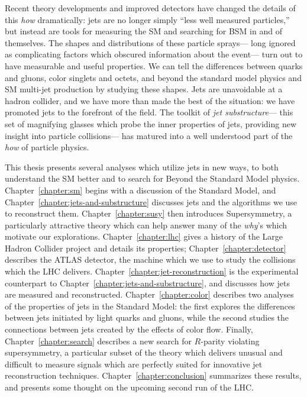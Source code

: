 Recent theory developments and improved detectors have changed the details of this \textit{how} dramatically: jets are no longer simply ``less well measured particles,'' but instead are tools for measuring the SM and searching for BSM in and of themselves. The shapes and distributions of these particle sprays--- long ignored as complicating factors which obscured information about the event--- turn out to have measurable and useful properties. We can tell the differences between quarks and gluons, color singlets and octets, and beyond the standard model physics and SM multi-jet production by studying these shapes. Jets are unavoidable at a hadron collider, and we have more than made the best of the situation: we have promoted jets to the forefront of the field. The toolkit of \textit{jet substructure}--- this set of magnifying glasses which probe the inner properties of jets, providing new insight into particle collisions--- has matured into a well understood part of the \textit{how} of particle physics.



This thesis presents several analyses which utilize jets in new ways, to both understand the SM better and to search for Beyond the Standard Model physics.  Chapter~\ref{chapter:sm} begins with a discussion of the Standard Model, and Chapter~\ref{chapter:jets-and-substructure} discusses jets and the algorithms we use to reconstruct them. Chapter~\ref{chapter:susy} then introduces Supersymmetry, a particularly attractive theory which can help answer many of the \textit{why}'s which motivate our explorations. Chapter~\ref{chapter:lhc} gives a history of the Large Hadron Collider project and details its properties; Chapter~\ref{chapter:detector} describes the ATLAS detector, the machine which we use to study the collisions which the LHC delivers. Chapter~\ref{chapter:jet-reconstruction} is the experimental counterpart to Chapter~\ref{chapter:jets-and-substructure}, and discusses how jets are measured and reconstructed. Chapter~\ref{chapter:color} describes two analyses of the properties of jets in the Standard Model: the first explores the differences between jets initiated by light quarks and gluons, while the second studies the connections between jets created by the effects of color flow. Finally, Chapter~\ref{chapter:search} describes a new search for $R$-parity violating supersymmetry, a particular subset of the theory which delivers unusual and difficult to measure signals which are perfectly suited for innovative jet reconstruction techniques. Chapter~\ref{chapter:conclusion} summarizes these results, and presents some thought on the upcoming second run of the LHC.